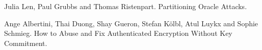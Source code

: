 \begin{hangparas}{1em}{1}

    Julia Len, Paul Grubbs and Thomas Ristenpart. Partitioning Oracle Attacks.



    Ange Albertini, Thai Duong, Shay Gueron, Stefan Kölbl, Atul Luykx and Sophie Schmieg. How to Abuse and Fix Authenticated Encryption Without Key Commitment.
\end{hangparas}